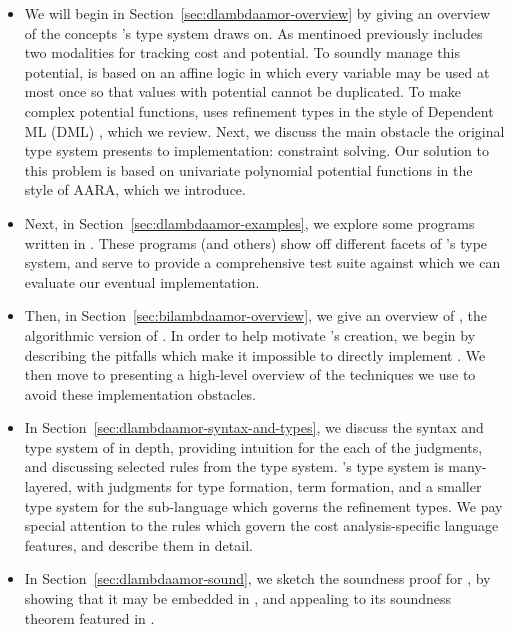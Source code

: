 \begin{itemize}
 \item We will begin in Section~\ref{sec:dlambdaamor-overview} by giving an overview of the concepts \lambdaamor's type system draws on. As mentinoed previously \lambdaamor includes two modalities for tracking cost and potential. To soundly manage this potential, \lambdaamor is based on an affine logic in which every variable may be used at most once so that values with potential cannot be duplicated. To make complex potential functions, \lambdaamor uses refinement types in the style of Dependent ML (DML) \cite{xi:jfp07}, which we review. Next, we discuss the main obstacle the original type system presents to implementation: constraint solving. Our solution to this problem is based on univariate polynomial potential functions in the style of AARA, which we introduce.
 
 \item Next, in Section~\ref{sec:dlambdaamor-examples}, we explore some programs written in \dlambdaamor. These programs (and others) show off different facets of \dlambdaamor's type system, and serve to provide a comprehensive test suite against which we can evaluate our eventual implementation.
 
 \item Then, in Section~\ref{sec:bilambdaamor-overview}, we give an overview of \bilambdaamor, the algorithmic version of \dlambdaamor. In order to help motivate \bilambdaamor's creation, we begin by describing the pitfalls which make it impossible to directly implement \dlambdaamor. We then move to presenting a high-level overview of the techniques we use to avoid these implementation obstacles.
 
 
 \item In Section~\ref{sec:dlambdaamor-syntax-and-types}, we discuss the syntax and type system of \dlambdaamor in depth, providing intuition for the each of the judgments, and discussing selected rules from the type system. \dlambdaamor's type system is many-layered, with judgments for type formation, term formation, and a smaller type system for the sub-language which governs the refinement types. We pay special attention to the rules which govern the cost analysis-specific language features, and describe them in detail.
 
  \item In Section~\ref{sec:dlambdaamor-sound}, we sketch the soundness proof for \dlambdaamor, by showing that it may be embedded in \lambdaamor, and appealing to its soundness theorem featured in \citet{rajani-et-al:popl21}.
 

\end{itemize}

